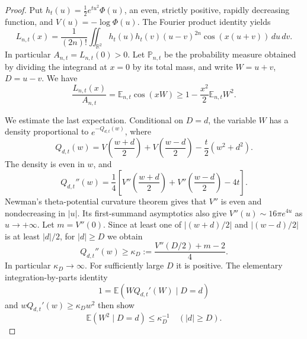 \begin{proof}
Put $h_t(u)=\tfrac12e^{tu^2}\Phi(u)$, an even,
strictly positive, rapidly decreasing function, and
$V(u)=-\log\Phi(u)$. The Fourier product identity yields
\begin{equation}
L_{n,t}(x)=\frac{1}{(2n)!}
\iint_{\mathbb R^2}
h_t(u)h_t(v)(u-v)^{2n}
\cos(x(u+v))\,du\,dv .
\label{eq:high-order-pair}
\end{equation}
In particular $A_{n,t}=L_{n,t}(0)>0$. Let
$\mathbb P_{n,t}$ be the probability measure obtained
by dividing the integrand at $x=0$ by its total mass,
and write $W=u+v$, $D=u-v$. We have
\begin{equation}
\frac{L_{n,t}(x)}{A_{n,t}}
=\mathbb E_{n,t}\cos(xW)
\ge1-\frac{x^2}{2}\mathbb E_{n,t}W^2 .
\label{eq:compact-cos-gate}
\end{equation}

We estimate the last expectation. Conditional on
$D=d$, the variable $W$ has a density proportional to
$e^{-Q_{d,t}(w)}$, where
\[
Q_{d,t}(w)
=V\!\left(\frac{w+d}{2}\right)
+V\!\left(\frac{w-d}{2}\right)
-\frac t2(w^2+d^2).
\]
The density is even in $w$, and
\begin{equation}
Q_{d,t}''(w)
=\frac14\left[
V''\!\left(\frac{w+d}{2}\right)
+V''\!\left(\frac{w-d}{2}\right)-4t
\right].
\label{eq:conditional-curvature}
\end{equation}
Newman's theta-potential curvature theorem
\cite{NewmanGHS} gives that $V''$ is even and
nondecreasing in $|u|$. Its first-summand
asymptotics also give
$V''(u)\sim16\pi e^{4u}$ as $u\to+\infty$.
Let $m=V''(0)$. Since at least one of
$|(w+d)/2|$ and $|(w-d)/2|$ is at least
$|d|/2$, for $|d|\ge D$ we obtain
\[
Q_{d,t}''(w)\ge
\kappa_D:=
\frac{V''(D/2)+m-2}{4}.
\]
In particular $\kappa_D\to\infty$.
For sufficiently large $D$ it is positive.
The elementary integration-by-parts identity
\[
1=\mathbb E(WQ_{d,t}'(W)\mid D=d)
\]
and $wQ_{d,t}'(w)\ge\kappa_Dw^2$
then show
\begin{equation}
\mathbb E(W^2\mid D=d)\le\kappa_D^{-1}
\quad(|d|\ge D).
\label{eq:conditional-variance}
\end{equation}


\end{proof}
